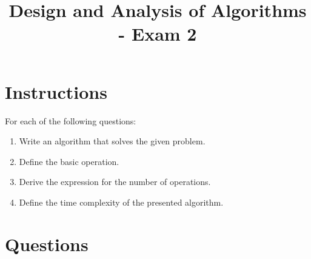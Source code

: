 \documentclass[12pt]{article}
\title{\vspace{-1.5cm} Design and Analysis of Algorithms - Exam 2}
\author{}
\date{}
\begin{document}
\maketitle

\vspace{-2cm} 
\section*{Instructions}
For each of the following questions:
\begin{enumerate}[noitemsep] 
    \item Write an algorithm that solves the given problem.
    \item Define the basic operation.
    \item Derive the expression for the number of operations.
    \item Define the time complexity of the presented algorithm.  
\end{enumerate}

\section*{Questions}
\end{document}
